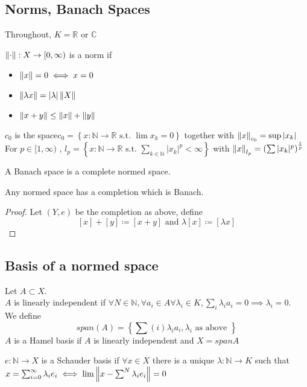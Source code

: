 \documentclass[../main.tex]{subfiles}
\begin{document}
\subsection{Norms, Banach Spaces}
Throughout, $K = \mathbb{R}$ or $ \mathbb{C}$
\begin{defn}
	$\left\lVert\cdot\right\rVert : X\to [ 0, \infty ) $ is a norm if
	\begin{itemize}
	\item $ \left\lVert x\right\rVert = 0 \iff x=0$ 
	\item $\left\lVert \lambda x \right\rVert = |\lambda| \left\lVert X\right\rVert$ 
	\item $\left\lVert x+y\right\rVert \leq \left\lVert x\right\rVert + \left\lVert y\right\rVert$ 
	\end{itemize}
\end{defn}
\begin{defn}
	$c_0$ is the space$c_0 = \left\{ x: \mathbb{N}\to \mathbb{R} \text{ s.t. } \lim x_k =0 \right\} $ together with $\left\lVert x\right\rVert _{c_0} = \sup |x_k |$ \\
	For $p \in [ 1, \infty ) $ , $l_p = \left\{ x: \mathbb{N}\to \mathbb{R} \text{ s.t. } \sum_{k \in \mathbb{N}} |x_k|^{p}< \infty  \right\} $ with $\left\lVert x\right\rVert _{l_p} = \left( \sum |x_k|^{p} \right)^{\frac{1}{p}}$ 
\end{defn}
\begin{defn}
	A Banach space is a complete normed space.	
\end{defn}
\begin{propo}
Any normed space has a completion which is Banach.
\end{propo}
\begin{proof}
Let $( Y,e) $ be the completion as above, define
\[ 
[ x] + [ y] \coloneqq  [ x+y] \text{ and } \lambda [ x] \coloneqq  [ \lambda x ] 
\]
\end{proof}
\subsection{Basis of a normed space}
\begin{defn}
	Let $A \subset X$.\\
	$A$ is linearly independent if $\forall N\in \mathbb{N}, \forall a_i \in A\forall \lambda_i \in K, \sum_i \lambda_i a_i = 0 \implies \lambda_i = 0$.\\
	We define
	\[ 
	span( A) = \left\{ \sum(i) \lambda_i a_i , \lambda_i \text{ as above }  \right\} 
	\]
	$A$ is a Hamel basis if $A$ is linearly independent and $X= span A$ 
\end{defn}
\begin{defn}
	$e: \mathbb{N}\to X$ is  a Schauder basis if $\forall x\in X$ there is a unique $\lambda: \mathbb{N}\to K$ such that $ x = \sum_{i = 0}^{ \infty } \lambda_i e_i \iff \lim \left\lVert x- \sum^{N}\lambda_i e_i \right\rVert =0$ 
\end{defn}
\end{document}

